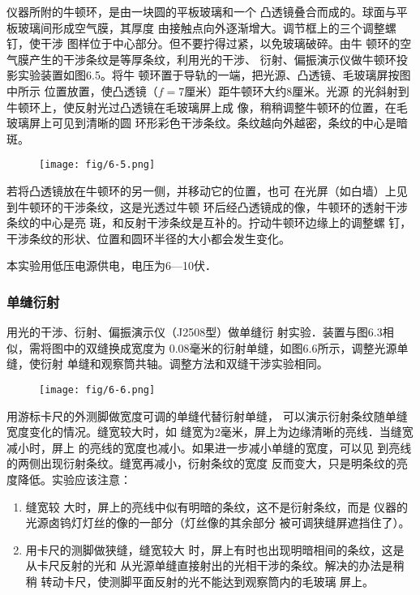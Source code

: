 仪器所附的牛顿环，是由一块圆的平板玻璃和一个
凸透镜叠合而成的。球面与平板玻璃间形成空气膜，其厚度
由接触点向外逐渐增大。调节框上的三个调整螺钉，使干涉
图样位于中心部分。但不要拧得过紧，以免玻璃破碎。由牛
顿环的空气膜产生的干涉条纹是等厚条纹，利用光的干涉、
衍射、偏振演示仪做牛顿环投影实验装置如图6.5。将牛
顿环置于导轨的一端，把光源、凸透镜、毛玻璃屏按图中所示
位置放置，使凸透镜（$f=7$厘米）距牛顿环大约8厘米。光源
的光斜射到牛顿环上，使反射光过凸透镜在毛玻璃屏上成
像，稍稍调整牛顿环的位置，在毛玻璃屏上可见到清晰的圆
环形彩色干涉条纹。条纹越向外越密，条纹的中心是暗
斑。

\begin{figure}[htp]
    \centering
    \texttt{[image: fig/6-5.png]}
    \caption{}
\end{figure}

若将凸透镜放在牛顿环的另一侧，并移动它的位置，也可
在光屏（如白墙）上见到牛顿环的干涉条纹，这是光透过牛顿
环后经凸透镜成的像，牛顿环的透射干涉条纹的中心是亮
斑，和反射干涉条纹是互补的。拧动牛顿环边缘上的调整螺
钉，干涉条纹的形状、位置和圆环半径的大小都会发生变化。

本实验用低压电源供电，电压为6—10伏．

\subsubsection{单缝衍射}
用光的干涉、衍射、偏振演示仪（J2508型）做单缝衍
射实验．装置与图6.3相似，需将图中的双缝换成宽度为
0.08毫米的衍射单缝，如图6.6所示，调整光源单缝，使衍射
单缝和观察筒共轴。调整方法和双缝干涉实验相同。
\begin{figure}[htp]
    \centering
    \texttt{[image: fig/6-6.png]}
    \caption{}
\end{figure}

用游标卡尺的外测脚做宽度可调的单缝代替衍射单缝，
可以演示衍射条纹随单缝宽度变化的情况。缝宽较大时，如
缝宽为2毫米，屏上为边缘清晰的亮线．当缝宽减小时，屏上
的亮线的宽度也减小。如果进一步减小单缝的宽度，可以见
到亮线的两侧出现衍射条纹。缝宽再减小，衍射条纹的宽度
反而变大，只是明条纹的亮度降低。实验应该注意：
\begin{enumerate}
\item 缝宽较
大时，屏上的亮线中似有明暗的条纹，这不是衍射条纹，而是
仪器的光源卤钨灯灯丝的像的一部分（灯丝像的其余部分
被可调狭缝屏遮挡住了）。
\item 用卡尺的测脚做狭缝，缝宽较大
时，屏上有时也出现明暗相间的条纹，这是从卡尺反射的光和
从光源单缝直接射出的光相干涉的条纹。解决的办法是稍稍
转动卡尺，使测脚平面反射的光不能达到观察筒内的毛玻璃
屏上。
\end{enumerate}



